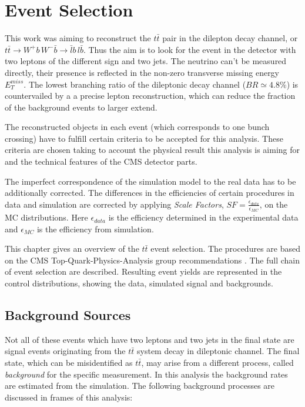 \chapter{Event Selection}\label{chapt:event_sel}
 
This work was aiming to reconstruct the $t\bar{t}$ pair in the dilepton decay channel, or
$t\bar{t} \to W^{+}b\,W^{-}\bar{b} \to \bar{l}b\,l\bar{b}$. Thus the aim is to 
look for the event in the detector with two leptons of the different sign and two jets. The 
neutrino can't be measured directly, their presence is reflected in the non-zero transverse
missing energy $E_{T}^{miss}$. The lowest branching ratio of the dileptonic decay channel
($BR \simeq 4.8\%$) is countervailed by a a precise lepton reconstruction, which can reduce
the fraction of the background events to larger extend.

The reconstructed objects in each event (which corresponds to one bunch crossing) have to fulfill certain 
criteria to be accepted for this analysis. These criteria are chosen taking to account the physical 
result this analysis is aiming for and the technical features of the CMS detector parts.

The imperfect correspondence of the simulation model to the real data has to be additionally 
corrected. The differences in the efficiencies of certain procedures in data and simulation 
are corrected by applying \textit{Scale Factors}, $SF = \frac{\epsilon_{data}}{\epsilon_{MC}}$, 
on the MC distributions. Here $\epsilon_{data}$ is the efficiency determined in the experimental 
data and $\epsilon_{MC}$ is the efficiency from simulation. 

This chapter gives an overview of the $t\bar{t}$ event selection. The 
procedures are based on the CMS Top-Quark-Physics-Analysis group recommendations \cite{TopPAGreco}.
The full chain of event selection are described. 
Resulting event yields are represented in the control distributions, showing the data, simulated signal and backgrounds.

\section{Background Sources}\label{sec:bg_intro}

Not all of these events which have two leptons and two jets in the final state are signal events
originating from the $t\bar{t}$ system decay in dileptonic channel. The final state, which can be 
misidentified as $t\bar{t}$, may arise from a different process, called \textit{background}
for the specific measurement. In this analysis the background rates are estimated from the simulation.
The following background processes are discussed in frames of this analysis:


